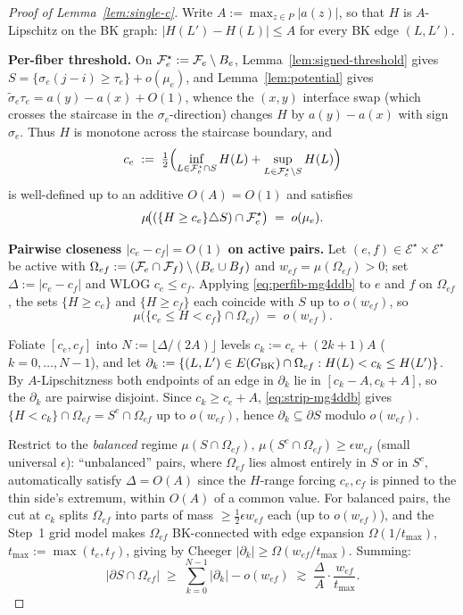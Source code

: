 \begin{proof}[Proof of Lemma~\ref{lem:single-c}]
Write $A:=\max_{z\in P}|a(z)|$, so that $H$ is $A$-Lipschitz on the
BK graph: $|H(L')-H(L)|\le A$ for every BK edge $(L,L')$.

\textbf{Per-fiber threshold.}
On $\mathcal{F}_{e}^\star:=\mathcal{F}_{e}\setminus B_e$,
Lemma~\ref{lem:signed-threshold} gives $S=\{\sigma_e(j-i)\ge\tau_e\}+
o(\mu_e)$, and Lemma~\ref{lem:potential} gives
$\widetilde\sigma_e\tau_e=a(y)-a(x)+O(1)$, whence the $(x,y)$
interface swap (which crosses the staircase in the
$\sigma_e$-direction) changes $H$ by $a(y)-a(x)$ with sign
$\sigma_e$.  Thus $H$ is monotone across the staircase boundary, and
\[
  c_e\;:=\;\tfrac12\Bigl(
    \inf_{L\in\mathcal{F}_{e}^\star\cap S}H(L)+
    \sup_{L\in\mathcal{F}_{e}^\star\setminus S}H(L)
  \Bigr)
\]
is well-defined up to an additive $O(A)=O(1)$ and satisfies
\begin{equation}\label{eq:perfib-mg4ddb}
  \mu\!\bigl((\{H\ge c_e\}\triangle S)\cap\mathcal{F}_{e}^\star\bigr)
  \;=\;o(\mu_e).
\end{equation}

\textbf{Pairwise closeness $|c_e-c_f|=O(1)$ on active pairs.}
Let $(e,f)\in\mathcal{E}^\star\times\mathcal{E}^\star$ be active with
$\Omega_{ef}:=(\mathcal{F}_{e}\cap\mathcal{F}_{f})\setminus(B_e\cup B_f)$ and
$w_{ef}=\mu(\Omega_{ef})>0$; set $\Delta:=|c_e-c_f|$ and WLOG
$c_e\le c_f$.  Applying \eqref{eq:perfib-mg4ddb} to $e$ and $f$ on
$\Omega_{ef}$, the sets $\{H\ge c_e\}$ and $\{H\ge c_f\}$ each
coincide with $S$ up to $o(w_{ef})$, so
\begin{equation}\label{eq:strip-mg4ddb}
  \mu\!\bigl(\{c_e\le H<c_f\}\cap\Omega_{ef}\bigr)\;=\;o(w_{ef}).
\end{equation}

Foliate $[c_e,c_f]$ into $N:=\lfloor\Delta/(2A)\rfloor$ levels
$c_k:=c_e+(2k{+}1)A$ ($k=0,\dots,N{-}1$), and let
$\partial_k:=\{(L,L')\in E(G_{\mathrm{BK}})\cap\Omega_{ef}:
H(L)<c_k\le H(L')\}$.  By $A$-Lipschitzness both endpoints of an
edge in $\partial_k$ lie in $[c_k{-}A,c_k{+}A]$, so the $\partial_k$
are pairwise disjoint.  Since $c_k\ge c_e+A$,
\eqref{eq:strip-mg4ddb} gives
$\{H<c_k\}\cap\Omega_{ef}=S^c\cap\Omega_{ef}$ up to $o(w_{ef})$,
hence $\partial_k\subseteq\partial S$ modulo $o(w_{ef})$.

Restrict to the \emph{balanced} regime
$\mu(S\cap\Omega_{ef}),\,\mu(S^c\cap\Omega_{ef})\ge\epsilon w_{ef}$
(small universal $\epsilon$): ``unbalanced'' pairs, where $\Omega_{ef}$
lies almost entirely in $S$ or in $S^c$, automatically satisfy
$\Delta=O(A)$ since the $H$-range forcing $c_e,c_f$ is pinned to the
thin side's extremum, within $O(A)$ of a common value.  For balanced
pairs, the cut at $c_k$ splits $\Omega_{ef}$ into parts of mass
$\ge\tfrac12\epsilon w_{ef}$ each (up to $o(w_{ef})$), and the
Step~1 grid model makes $\Omega_{ef}$ BK-connected with edge
expansion $\Omega(1/t_{\max})$, $t_{\max}:=\max(t_e,t_f)$, giving by
Cheeger $|\partial_k|\ge\Omega(w_{ef}/t_{\max})$.  Summing:
\begin{equation}\label{eq:bdry-pair-mg4ddb}
  |\partial S\cap\Omega_{ef}|\;\ge\;
  \sum_{k=0}^{N-1}|\partial_k|-o(w_{ef})
  \;\gtrsim\;\frac{\Delta}{A}\cdot\frac{w_{ef}}{t_{\max}}.
\end{equation}


\end{proof}
